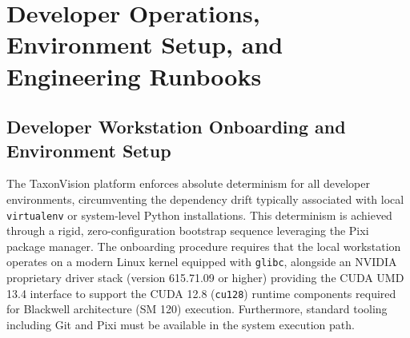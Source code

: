\chapter{Developer Operations, Environment Setup, and Engineering Runbooks}
\label{ch:developer_runbooks}


\section{Developer Workstation Onboarding and Environment Setup}
\label{sec:workstation_onboarding}

The TaxonVision platform enforces absolute determinism for all developer environments, circumventing the dependency drift typically associated with local \texttt{virtualenv} or system-level Python installations. This determinism is achieved through a rigid, zero-configuration bootstrap sequence leveraging the Pixi package manager. The onboarding procedure requires that the local workstation operates on a modern Linux kernel equipped with \texttt{glibc}, alongside an NVIDIA proprietary driver stack (version 615.71.09 or higher) providing the CUDA UMD 13.4 interface to support the CUDA 12.8 (\texttt{cu128}) runtime components required for Blackwell architecture (SM 120) execution. Furthermore, standard tooling including Git and Pixi must be available in the system execution path.

